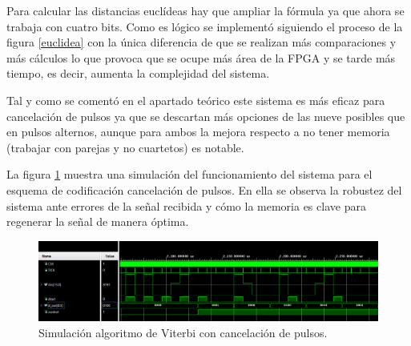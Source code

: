 Para calcular las distancias euclídeas hay que ampliar la fórmula ya que ahora se 
trabaja con cuatro bits. Como es lógico se implementó siguiendo el proceso de la 
figura \ref{euclidea} con la única diferencia de que se realizan más comparaciones
y más cálculos lo que provoca que se ocupe más área de la FPGA y se tarde más 
tiempo, es decir, aumenta la complejidad del sistema. 

Tal y como se comentó en el apartado teórico este sistema es más eficaz para 
cancelación de pulsos ya que se descartan más opciones de las nueve posibles que 
en pulsos alternos, aunque para ambos la mejora respecto a no tener memoria (trabajar
con parejas y no cuartetos) es notable.

La figura \ref{sim_viterbi_cancel} 
muestra una simulación del funcionamiento del sistema para el esquema de
codificación cancelación de pulsos. En ella se observa la robustez del sistema ante 
errores de la señal recibida y cómo la memoria es clave para regenerar la señal de 
manera óptima.

\begin{figure}[ht]
    \centering
    \includegraphics[scale=0.45]{./figuras/sim_viterbi_cancel.png}
    \caption{\small{Simulación algoritmo de Viterbi con cancelación de pulsos.}}
    \label{sim_viterbi_cancel}%
\end{figure}

\chapterend{}